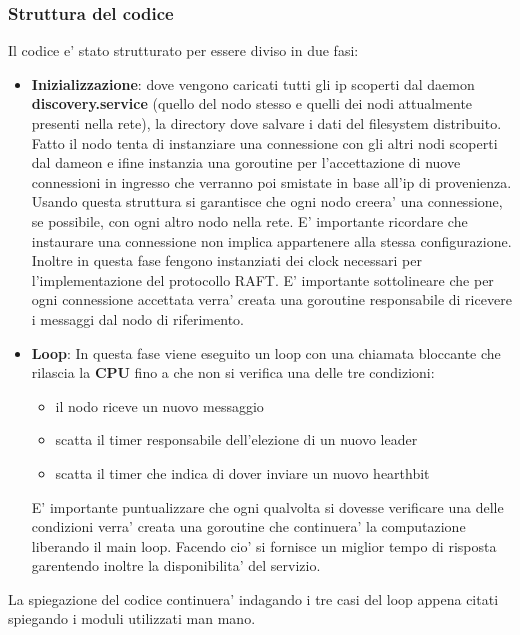 \subsubsection{Struttura del codice\\}
Il codice e' stato strutturato per essere diviso in due fasi: 
\begin{itemize}
    \item \textbf{Inizializzazione}: dove vengono caricati tutti gli ip scoperti dal daemon
        \textbf{discovery.service} (quello del nodo stesso e quelli dei nodi attualmente presenti 
        nella rete), la directory dove salvare i dati del filesystem distribuito. Fatto 
        il nodo tenta di instanziare una connessione con gli altri nodi scoperti dal dameon e 
        ifine instanzia una goroutine per l'accettazione di nuove connessioni in ingresso che 
        verranno poi smistate in base all'ip di provenienza. Usando questa struttura si garantisce
        che ogni nodo creera' una connessione, se possibile, con ogni altro nodo nella rete. 
        E' importante ricordare che instaurare una connessione non implica appartenere 
        alla stessa configurazione. Inoltre in questa fase fengono instanziati
        dei clock necessari per l'implementazione del protocollo RAFT.
        E' importante sottolineare che per ogni connessione accettata verra' creata una 
        goroutine responsabile di ricevere i messaggi dal nodo di riferimento.
    \item \textbf{Loop}: In questa fase viene eseguito un loop con una chiamata bloccante che 
        rilascia la \textbf{CPU} fino a che non si verifica una delle tre condizioni:
        \begin{itemize}
            \item il nodo riceve un nuovo messaggio
            \item scatta il timer responsabile dell'elezione di un nuovo leader
            \item scatta il timer che indica di dover inviare un nuovo hearthbit
        \end{itemize}
        E' importante puntualizzare che ogni qualvolta si dovesse verificare una delle condizioni
        verra' creata una goroutine che continuera' la computazione liberando il main loop. 
        Facendo cio' si fornisce un miglior tempo di risposta garentendo inoltre la disponibilita' 
        del servizio.
\end{itemize}
La spiegazione del codice continuera' indagando i tre casi del loop appena citati spiegando i moduli 
utilizzati man mano.

